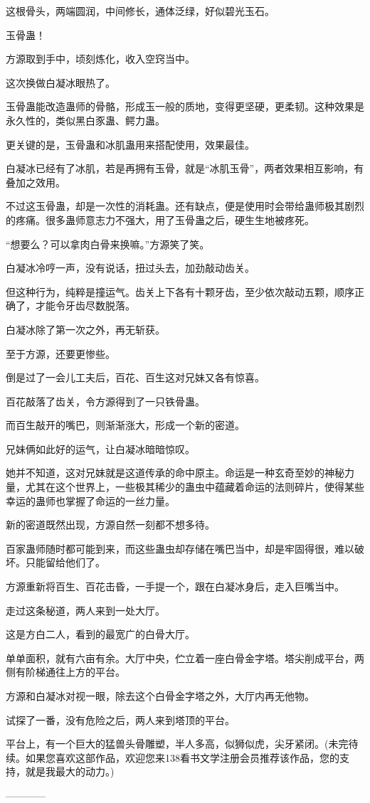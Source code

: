 \begin{this_body}
这根骨头，两端圆润，中间修长，通体泛绿，好似碧光玉石。

玉骨蛊！

方源取到手中，顷刻炼化，收入空窍当中。

这次换做白凝冰眼热了。

玉骨蛊能改造蛊师的骨骼，形成玉一般的质地，变得更坚硬，更柔韧。这种效果是永久性的，类似黑白豕蛊、鳄力蛊。

更关键的是，玉骨蛊和冰肌蛊用来搭配使用，效果最佳。

白凝冰已经有了冰肌，若是再拥有玉骨，就是“冰肌玉骨”，两者效果相互影响，有叠加之效用。

不过这玉骨蛊，却是一次性的消耗蛊。还有缺点，便是使用时会带给蛊师极其剧烈的疼痛。很多蛊师意志力不强大，用了玉骨蛊之后，硬生生地被疼死。

“想要么？可以拿肉白骨来换嘛。”方源笑了笑。

白凝冰冷哼一声，没有说话，扭过头去，加劲敲动齿关。

但这种行为，纯粹是撞运气。齿关上下各有十颗牙齿，至少依次敲动五颗，顺序正确了，才能令牙齿尽数脱落。

白凝冰除了第一次之外，再无斩获。

至于方源，还要更惨些。

倒是过了一会儿工夫后，百花、百生这对兄妹又各有惊喜。

百花敲落了齿关，令方源得到了一只铁骨蛊。

而百生敲开的嘴巴，则渐渐涨大，形成一个新的密道。

兄妹俩如此好的运气，让白凝冰暗暗惊叹。

她并不知道，这对兄妹就是这道传承的命中原主。命运是一种玄奇至妙的神秘力量，尤其在这个世界上，一些极其稀少的蛊虫中蕴藏着命运的法则碎片，使得某些幸运的蛊师也掌握了命运的一丝力量。

新的密道既然出现，方源自然一刻都不想多待。

百家蛊师随时都可能到来，而这些蛊虫却存储在嘴巴当中，却是牢固得很，难以破坏。只能留给他们了。

方源重新将百生、百花击昏，一手提一个，跟在白凝冰身后，走入巨嘴当中。

走过这条秘道，两人来到一处大厅。

这是方白二人，看到的最宽广的白骨大厅。

单单面积，就有六亩有余。大厅中央，伫立着一座白骨金字塔。塔尖削成平台，两侧有阶梯通往上方的平台。

方源和白凝冰对视一眼，除去这个白骨金字塔之外，大厅内再无他物。

试探了一番，没有危险之后，两人来到塔顶的平台。

平台上，有一个巨大的猛兽头骨雕塑，半人多高，似狮似虎，尖牙紧闭。(未完待续。如果您喜欢这部作品，欢迎您来138看书文学注册会员推荐该作品，您的支持，就是我最大的动力。)

------------

\end{this_body}


